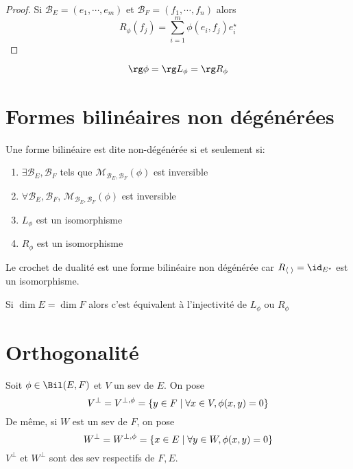 \begin{proof}
    Si $\mathcal  B_E=(e_1, \cdots , e_m)$ et $\mathcal  B_F=(f_1, \cdots , f_n)$ alors \[
        R_\phi(f_j)=\sum_{i=1}^m \phi(e_i, f_j)e_i^\star
    \] 
\end{proof}

\begin{cor}
\[
\rg \phi=\rg L_\phi=\rg R_\phi
\] 
\end{cor}

\section{Formes bilinéaires non dégénérées}

\begin{prop}
    Une forme bilinéaire est dite non-dégénérée si et seulement si: \begin{enumerate}
        \item $\exists  \mathcal  B_E, \mathcal  B_F$ tels que $\mathcal  M_{\mathcal  B_E, \mathcal  B_F}(\phi)$ est inversible
        \item $\forall  \mathcal  B_E, \mathcal  B_F$, $\mathcal  M_{\mathcal  B_E, \mathcal  B_F}(\phi)$ est inversible
        \item $L_\phi$ est un isomorphisme
        \item  $R_\phi$ est un isomorphisme
    \end{enumerate}
\end{prop}

\begin{ex}
Le crochet de dualité est une forme bilinéaire non dégénérée car $R_{\langle\;\rangle}=\id_{E^\star}$ est un isomorphisme.
\end{ex}

\begin{rem}
Si $\dim E=\dim F$ alors c'est équivalent à l'injectivité de  $L_\phi$ ou  $R_\phi$
\end{rem}

\section{Orthogonalité}

\begin{dfn}
    Soit $\phi \in  \Bil(E, F)$ et $V$ un sev de $E$. On pose \[
        V^\bot = V^{\bot, \phi}= \left\{ y \in  F \suchthat \forall  x  \in  V, \phi(x, y)=0 \right\} 
    \] 
    De même, si $W$ est un sev de $F$, on pose \[
        W^\bot = W^{\bot, \phi}= \left\{ x \in  E \suchthat \forall  y  \in  W, \phi(x, y)=0 \right\} 
    \] 
    $V^\bot$ et $W^\bot$ sont des sev respectifs de $F, E$.
\end{dfn}

